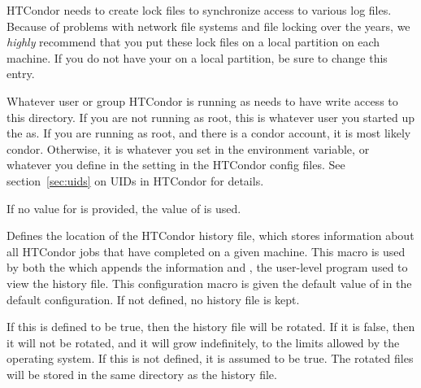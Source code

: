 \begin{description}
\label{param:Lock}
\item[\Macro{LOCK}]
  HTCondor needs to create
  lock files to synchronize access to various log files.  Because of
  problems with network file systems and file locking over
  the years, we \emph{highly} recommend that you put these lock
  files on a local partition on each machine.  If you do not have your
   on a local partition, be sure to change this
  entry.

  Whatever user or group HTCondor is running as needs to have
  write access to this directory.  If you are not running as root, this
  is whatever user you started up the  as.  If you are
  running as root, and there is a condor account, it is most
  likely condor.
  Otherwise, it is whatever you set in the 
  environment variable, or whatever you define in the
   setting in the HTCondor config files.
  See section~\ref{sec:uids} on UIDs in HTCondor for details.

  If no value for  is provided, the value of 
  is used.


\label{param:History}
\item[\Macro{HISTORY}]
  Defines the
  location of the HTCondor history file, which stores information about
  all HTCondor jobs that have completed on a given machine.  This macro
  is used by both the  which appends the information
  and , the user-level program used to view
  the history file.
  This configuration macro is given the default value of
   in the default configuration.
  If not defined,
  no history file is kept.

\label{param:EnableHistoryRotation} 
\item[\Macro{ENABLE\_HISTORY\_ROTATION}]
  If this is defined to be true, then the
  history file will be rotated. If it is false, then it will not be
  rotated, and it will grow indefinitely, to the limits allowed by the
  operating system. If this is not defined, it is assumed to be
  true. The rotated files will be stored in the same directory as the
  history file. 


\end{description}
